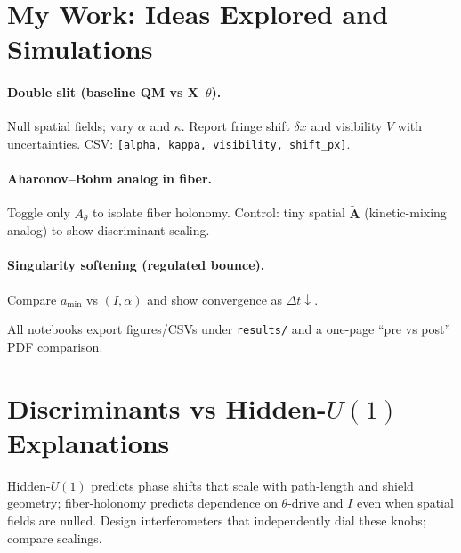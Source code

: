 \section{My Work: Ideas Explored and Simulations}
\label{sec:work}
\paragraph{Double slit (baseline QM vs X--$\theta$).}
Null spatial fields; vary $\alpha$ and $\kappa$. Report fringe shift $\delta x$ and visibility $V$ with uncertainties.
CSV: \texttt{[alpha, kappa, visibility, shift\_px]}.

\paragraph{Aharonov--Bohm analog in fiber.}
Toggle only $A_\theta$ to isolate fiber holonomy. Control: tiny spatial $\tilde{\mathbf{A}}$ (kinetic-mixing analog)
to show discriminant scaling.

\paragraph{Singularity softening (regulated bounce).}
Compare $a_{\min}$ vs $(I,\alpha)$ and show convergence as $\Delta t\!\downarrow$.
\medskip

All notebooks export figures/CSVs under \texttt{results/} and a one-page “pre vs post” PDF comparison.

\section{Discriminants vs Hidden-$U(1)$ Explanations}
Hidden-$U(1)$ predicts phase shifts that scale with path-length and shield geometry;
fiber-holonomy predicts dependence on $\theta$-drive and $I$ even when spatial fields are nulled.
Design interferometers that independently dial these knobs; compare scalings.

% 
% 
